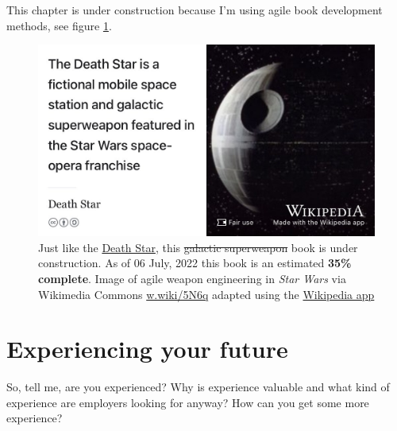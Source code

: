 \documentclass[
]{book}
\begin{document}
This chapter is under construction because I'm using agile book development methods, see figure \ref{fig:deathstar-fig}.

\begin{figure}

{\centering \includegraphics[width=0.99\linewidth]{images/DeathStar2} 

}

\caption{Just like the \href{https://en.wikipedia.org/wiki/Death_Star}{Death Star}, this \sout{galactic superweapon} book is under construction. As of 06 July, 2022 this book is an estimated \textbf{35\% complete}. Image of agile weapon engineering in \emph{Star Wars} via Wikimedia Commons \href{https://w.wiki/5N6q}{w.wiki/5N6q} adapted using the \href{https://apps.apple.com/gb/app/wikipedia/id324715238}{Wikipedia app}}\label{fig:deathstar-fig}
\end{figure}



\hypertarget{experiencing}{%
\chapter{Experiencing your future}\label{experiencing}}

So, tell me, are you experienced? Why is experience valuable and what kind of experience are employers looking for anyway? How can you get some more experience? 🤔
\end{document}
